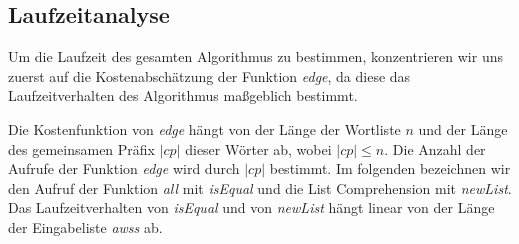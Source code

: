 \documentclass[12pt]{report}
\newcommand{\abs}[1]{\left|#1\right|}
\begin{document}




\subsection{Laufzeitanalyse}
\label{sec:Laufzeitanalyse}

Um die Laufzeit des gesamten Algorithmus zu bestimmen, konzentrieren wir uns zuerst auf die Kostenabschätzung der Funktion \textit{edge}, da diese das Laufzeitverhalten des Algorithmus maßgeblich bestimmt.


Die Kostenfunktion von \textit{edge} hängt von der Länge der Wortliste $n$ und der Länge des gemeinsamen Präfix $\abs{cp}$ dieser Wörter ab, wobei $\abs{cp} \leq n$. Die Anzahl der Aufrufe der Funktion \textit{edge} wird durch $\abs{cp}$ bestimmt. Im folgenden bezeichnen wir den Aufruf der Funktion \textit{all} mit \textit{isEqual} und die List Comprehension mit \textit{newList}. Das Laufzeitverhalten von \textit{isEqual} und von \textit{newList} hängt linear von der Länge der Eingabeliste \textit{awss} ab.
\end{document}
